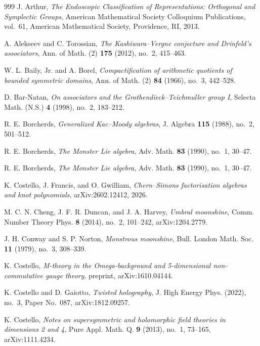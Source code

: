 \begin{thebibliography}{999}
J. Arthur, \emph{The Endoscopic Classification of Representations: Orthogonal and Symplectic Groups}, American Mathematical Society Colloquium Publications, vol.~61, American Mathematical Society, Providence, RI, 2013.

A. Alekseev and C. Torossian, \emph{The Kashiwara--Vergne conjecture and Drinfeld's associators}, Ann. of Math. (2) \textbf{175} (2012), no.~2, 415--463.

W. L. Baily, Jr. and A. Borel, \emph{Compactification of arithmetic quotients of bounded symmetric domains}, Ann. of Math. (2) \textbf{84} (1966), no.~3, 442--528.

D. Bar-Natan, \emph{On associators and the Grothendieck--Teichmuller group I}, Selecta Math. (N.S.) \textbf{4} (1998), no.~2, 183--212.

R. E. Borcherds, \emph{Generalized Kac--Moody algebras}, J. Algebra \textbf{115} (1988), no.~2, 501--512.

R. E. Borcherds, \emph{The Monster Lie algebra}, Adv. Math. \textbf{83} (1990), no.~1, 30--47.

R. E. Borcherds, \emph{The Monster Lie algebra}, Adv. Math. \textbf{83} (1990), no.~1, 30--47.

K. Costello, J. Francis, and O. Gwilliam, \emph{Chern--Simons factorisation algebras and knot polynomials}, arXiv:2602.12412, 2026.

M. C. N. Cheng, J. F. R. Duncan, and J. A. Harvey, \emph{Umbral moonshine}, Comm. Number Theory Phys. \textbf{8} (2014), no.~2, 101--242, arXiv:1204.2779.

J. H. Conway and S. P. Norton, \emph{Monstrous moonshine}, Bull. London Math. Soc. \textbf{11} (1979), no.~3, 308--339.

K. Costello, \emph{M-theory in the Omega-background and 5-dimensional non-commutative gauge theory}, preprint, arXiv:1610.04144.

K. Costello and D. Gaiotto, \emph{Twisted holography}, J. High Energy Phys. (2022), no.~3, Paper No.~087, arXiv:1812.09257.

K. Costello, \emph{Notes on supersymmetric and holomorphic field theories in dimensions 2 and 4}, Pure Appl. Math. Q. \textbf{9} (2013), no.~1, 73--165, arXiv:1111.4234.


\end{thebibliography}
